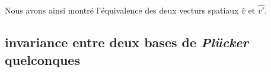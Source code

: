 Nous avons ainsi montré l'équivalence des deux vecturs spatiaux $\widehat{v}$ et $\widehat{v'}$.

\subsection{invariance entre deux bases de \emph{Plücker} quelconques}


